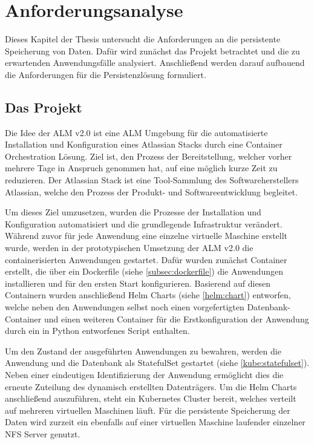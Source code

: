 \chapter{Anforderungsanalyse}
\label{cha:anfoderungen}
Dieses Kapitel der Thesis untersucht die Anforderungen an die persistente Speicherung von Daten. Dafür wird zunächst das Projekt betrachtet und die zu erwartenden Anwendungsfälle analysiert. Anschließend werden darauf aufbauend die Anforderungen für die Persistenzlösung formuliert.

\section{Das Projekt}
\label{projekt}
Die Idee der ALM v2.0 ist eine \ac{ALM} Umgebung für die automatisierte Installation und Konfiguration eines Atlassian Stacks durch eine Container Orchestration Lösung. Ziel ist, den Prozess der Bereitstellung, welcher vorher mehrere Tage in Anspruch genommen hat, auf eine möglich kurze Zeit zu reduzieren. Der Atlassian Stack ist eine Tool-Sammlung des Softwareherstellers Atlassian, welche den Prozess der Produkt- und Softwareentwicklung begleitet. \medskip

Um dieses Ziel umzusetzen, wurden die Prozesse der Installation und Konfiguration automatisiert und die grundlegende Infrastruktur verändert. Während zuvor für jede Anwendung eine einzelne virtuelle Maschine erstellt wurde, werden in der prototypischen Umsetzung der ALM v2.0 die containerisierten Anwendungen gestartet. Dafür wurden zunächst Container erstellt, die über ein Dockerfile (siehe \ref{subsec:dockerfile}) die Anwendungen installieren und für den ersten Start konfigurieren. Basierend auf diesen Containern wurden anschließend Helm Charts (siehe \ref{helm:chart}) entworfen, welche neben den Anwendungen selbst noch einen vorgefertigten Datenbank-Container und einen weiteren Container für die Erstkonfiguration der Anwendung durch ein in Python entworfenes Script enthalten. \medskip

Um den Zustand der ausgeführten Anwendungen zu bewahren, werden die Anwendung und die Datenbank als StatefulSet gestartet (siehe \ref{kube:statefulset}). Neben einer eindeutigen Identifizierung der Anwendung ermöglicht dies die erneute Zuteilung des dynamisch erstellten Datenträgers. Um die Helm Charts anschließend auszuführen, steht ein Kubernetes Cluster bereit, welches verteilt auf mehreren virtuellen Maschinen läuft. Für die persistente Speicherung der Daten wird zurzeit ein ebenfalls auf einer virtuellen Maschine laufender einzelner \ac{NFS} Server genutzt.
 
